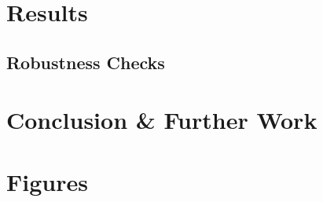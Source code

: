 \documentclass[11pt, oneside]{article}
\begin{document}
	\section{Results}
	
	\label{results}
	
	\subsection{Robustness Checks}
	
	\label{robustness}
	
	\section{Conclusion \& Further Work}
	
	\label{conclusion}
	\newpage
	
	
	
	
	\newpage
	\section*{Figures}
	
	
	\newpage
	

	
	
\end{document}
